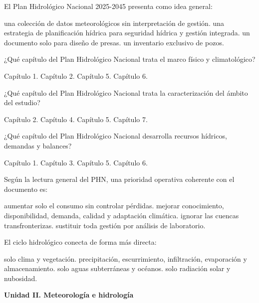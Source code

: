 \question [3] El Plan Hidrológico Nacional 2025-2045 presenta como idea general:
\begin{choices}
\choice una colección de datos meteorológicos sin interpretación de gestión.
\CorrectChoice una estrategia de planificación hídrica para seguridad hídrica y gestión integrada.
\choice un documento solo para diseño de presas.
\choice un inventario exclusivo de pozos.
\end{choices}

\question [2] ¿Qué capítulo del Plan Hidrológico Nacional trata el marco físico y climatológico?
\begin{choices}
\choice Capítulo 1.
\CorrectChoice Capítulo 2.
\choice Capítulo 5.
\choice Capítulo 6.
\end{choices}

\question [2] ¿Qué capítulo del Plan Hidrológico Nacional trata la caracterización del ámbito del estudio?
\begin{choices}
\choice Capítulo 2.
\choice Capítulo 4.
\CorrectChoice Capítulo 5.
\choice Capítulo 7.
\end{choices}

\question [2] ¿Qué capítulo del Plan Hidrológico Nacional desarrolla recursos hídricos, demandas y balances?
\begin{choices}
\choice Capítulo 1.
\choice Capítulo 3.
\choice Capítulo 5.
\CorrectChoice Capítulo 6.
\end{choices}

\question [3] Según la lectura general del PHN, una prioridad operativa coherente con el documento es:
\begin{choices}
\choice aumentar solo el consumo sin controlar pérdidas.
\CorrectChoice mejorar conocimiento, disponibilidad, demanda, calidad y adaptación climática.
\choice ignorar las cuencas transfronterizas.
\choice sustituir toda gestión por análisis de laboratorio.
\end{choices}

\question [3] El ciclo hidrológico conecta de forma más directa:
\begin{choices}
\choice solo clima y vegetación.
\CorrectChoice precipitación, escurrimiento, infiltración, evaporación y almacenamiento.
\choice solo aguas subterráneas y océanos.
\choice solo radiación solar y nubosidad.
\end{choices}

\item[]\textbf{Unidad II. Meteorología e hidrología}\par\medskip

